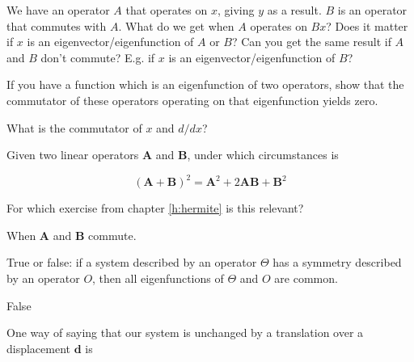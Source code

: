 \begin{exer}
    We have an operator $A$ that operates on $x$, giving $y$ as a result. $B$ is an operator that commutes with $A$. What do we get when $A$ operates on $Bx$? Does it matter if $x$ is an eigenvector/eigenfunction of $A$ or $B$? Can you get the same result if $A$ and $B$ don't commute? E.g. if $x$ is an eigenvector/eigenfunction of $B$?
  \end{exer}


\begin{exer}
  If you have a function which is an eigenfunction of two operators, show that the commutator of these operators operating on that eigenfunction yields zero.
\end{exer}

\begin{exer}
What is the commutator of $x$ and $d/dx$?  
\end{exer}

\begin{exer}
Given two linear operators $\mathbf A$ and $\mathbf B$, under which circumstances is

$$\left ( {\mathbf A} + {\mathbf B} \right ) ^2 =  {\mathbf A}^2 + 2 {\mathbf A}{\mathbf B}  + {\mathbf B}^2$$

For which exercise from chapter \ref{h:hermite} is this relevant?
\begin{sol}
When $\mathbf A$ and $\mathbf B$ commute.
\end{sol}
\end{exer}

\begin{exer}
True or false: if a system described by an operator $\Theta$ has a symmetry described by an operator $O$, then all eigenfunctions of $\Theta$ and $O$ are common.
  \begin{sol}
    False
\end{sol}  
\end{exer}

\pagebreak


One way of saying that our system is unchanged by a translation over a displacement ${\mathbf d}$ is

